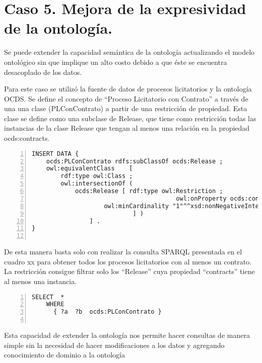 \section{Caso 5. Mejora de la expresividad de la ontología. }

Se puede extender la capacidad semántica de la ontología actualizando el modelo ontológico sin que implique un alto costo debido a que éste se encuentra desacoplado de los datos.

Para este caso se utilizó la fuente de datos de procesos licitatorios y la ontología OCDS. Se define el concepto de “Proceso Licitatorio con Contrato” a través de una una clase (PLConContrato) a partir de una restricción de propiedad. Esta clase se define como una subclase de Release, que tiene como restricción todas las instancias de la clase Release que tengan al menos una relación en la propiedad ocds:contracts.


\begin{lstlisting}[captionpos=b, caption=Información referente al proceso licitatorio cuyo identificacor es, label=lst:caso1,  numbers=left,  numberstyle=\tiny\color{mygray},
    basicstyle=\small,frame=single]
INSERT DATA {
    ocds:PLConContrato rdfs:subClassOf ocds:Release ; 
    owl:equivalentClass    [ 
        rdf:type owl:Class ;
        owl:intersectionOf (   
            ocds:Release [ rdf:type owl:Restriction ;
                                        owl:onProperty ocds:contracts; 
                    owl:minCardinality "1"^^xsd:nonNegativeInteger ;
                            ] )
                ] .
}
    
 \end{lstlisting}

 De esta manera basta solo con realizar la consulta SPARQL presentada en el cuadro xx para obtener todos los procesos licitatorios con al menos un contrato. La restricción consigue filtrar solo los “Release” cuya propiedad “contracts” tiene al menos una instancia.

 \begin{lstlisting}[captionpos=b, caption=Información referente al proceso licitatorio cuyo identificacor es, label=lst:caso1,  numbers=left,  numberstyle=\tiny\color{mygray},
    basicstyle=\small,frame=single]
SELECT  *
    WHERE
      { ?a  ?b  ocds:PLConContrato }
    
 \end{lstlisting}

 Esta capacidad de extender la ontología nos permite hacer consultas de manera simple sin la necesidad de hacer modificaciones a los datos y agregando conocimiento de dominio a la ontología